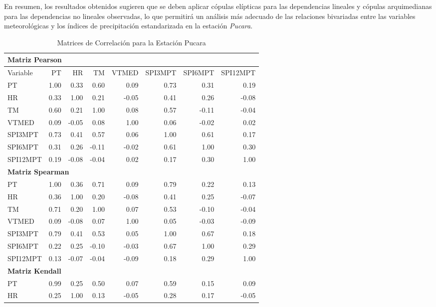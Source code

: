 En resumen, los resultados obtenidos sugieren que se deben aplicar cópulas elípticas para las dependencias lineales y cópulas arquimedianas para las dependencias no lineales observadas, lo que permitirá un análisis más adecuado de las relaciones bivariadas entre las variables meteorológicas y los índices de precipitación estandarizada en la estación \textit{Pucara}.


\begin{table}[ht]
\centering
\caption{Matrices de Correlación para la Estación Pucara}
\begin{tabular}{lrrrrrrr}
\toprule
\multicolumn{8}{l}{\textbf{Matriz Pearson}} \\
\midrule
Variable & PT & HR & TM & VTMED & SPI3MPT & SPI6MPT & SPI12MPT \\
\midrule
PT       & 1.00 & 0.33 & 0.60 & 0.09 & 0.73 & 0.31 & 0.19 \\
HR       & 0.33 & 1.00 & 0.21 & -0.05 & 0.41 & 0.26 & -0.08 \\
TM       & 0.60 & 0.21 & 1.00 & 0.08 & 0.57 & -0.11 & -0.04 \\
VTMED    & 0.09 & -0.05 & 0.08 & 1.00 & 0.06 & -0.02 & 0.02 \\
SPI3MPT  & 0.73 & 0.41 & 0.57 & 0.06 & 1.00 & 0.61 & 0.17 \\
SPI6MPT  & 0.31 & 0.26 & -0.11 & -0.02 & 0.61 & 1.00 & 0.30 \\
SPI12MPT & 0.19 & -0.08 & -0.04 & 0.02 & 0.17 & 0.30 & 1.00 \\
\midrule
\multicolumn{8}{l}{\textbf{Matriz Spearman}} \\
\midrule
PT       & 1.00 & 0.36 & 0.71 & 0.09 & 0.79 & 0.22 & 0.13 \\
HR       & 0.36 & 1.00 & 0.20 & -0.08 & 0.41 & 0.25 & -0.07 \\
TM       & 0.71 & 0.20 & 1.00 & 0.07 & 0.53 & -0.10 & -0.04 \\
VTMED    & 0.09 & -0.08 & 0.07 & 1.00 & 0.05 & -0.03 & -0.09 \\
SPI3MPT  & 0.79 & 0.41 & 0.53 & 0.05 & 1.00 & 0.67 & 0.18 \\
SPI6MPT  & 0.22 & 0.25 & -0.10 & -0.03 & 0.67 & 1.00 & 0.29 \\
SPI12MPT & 0.13 & -0.07 & -0.04 & -0.09 & 0.18 & 0.29 & 1.00 \\
\midrule
\multicolumn{8}{l}{\textbf{Matriz Kendall}} \\
\midrule
PT       & 0.99 & 0.25 & 0.50 & 0.07 & 0.59 & 0.15 & 0.09 \\
HR       & 0.25 & 1.00 & 0.13 & -0.05 & 0.28 & 0.17 & -0.05 \\

\end{tabular}
\end{table}
